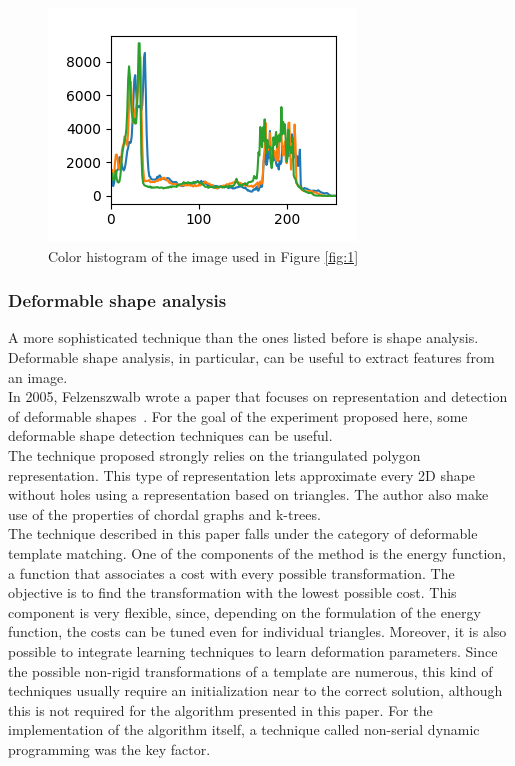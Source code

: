 \documentclass[conference]{IEEEtran}
\begin{document}
				\begin{figure}[!ht]
					\centerline{\includegraphics[width=\linewidth]{imgs/obama_histogram.png}}
					\caption{Color histogram of the image used in Figure \ref{fig:1}}
					\label{fig:2}
				\end{figure}
				
				\subsubsection{Deformable shape analysis}
			
					A more sophisticated technique than the ones listed before is shape analysis. Deformable shape analysis, in particular, can be useful to extract features from an image.\\
					In 2005, Felzenszwalb wrote a paper that focuses on representation and detection of deformable shapes~\cite{felzenszwalb2005representation}. For the goal of the experiment proposed here, some deformable shape 
					detection techniques can be useful. \\
					The technique proposed strongly relies on the triangulated polygon representation. This type of representation lets approximate every 2D shape without holes using a representation based on triangles. 
					The author also make use of the properties of chordal graphs and k-trees.\\
					The technique described in this paper falls under the category of deformable template matching. One of the components of the method is the energy function, a function that associates a cost with every 
					possible transformation. The objective is to find the transformation with the lowest possible cost. This component is very flexible, since, depending on the formulation of the energy function, the costs 
					can be tuned even for individual triangles. Moreover, it is also possible to integrate learning techniques to learn deformation parameters.
					Since the possible non-rigid transformations of a template are numerous, this kind of techniques usually require an initialization near to the correct solution, 
					although this is not required for the algorithm presented in this paper. For the implementation of the algorithm itself, a technique called non-serial dynamic programming was the key factor.
					
\end{document}
